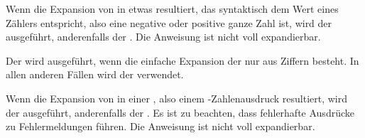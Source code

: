 \begin{Declaration}
\end{Declaration}
Wenn
die Expansion von  in etwas resultiert, das syntaktisch dem Wert
eines Zählers entspricht, also eine negative oder positive ganze Zahl ist,
wird der  ausgeführt, anderenfalls der
. Die Anweisung ist nicht voll expandierbar.%
\iffalse%
\iftrue%
\ Von dieser Anweisung gibt es keine interne Variante.%
\else%
\ Es gibt keine interne Variante.%
\fi%
\fi%
\EndIndexGroup


\begin{Declaration}
\end{Declaration}
Der  wird ausgeführt,
wenn die einfache Expansion der  nur aus Ziffern
besteht. In allen anderen Fällen wird der  verwendet.%
\iffalse%
\iftrue%
\ Von dieser Anweisung gibt es keine interne Variante.%
\else%
\ Es gibt keine interne Variante.%
\fi%
\fi%
\EndIndexGroup


\begin{Declaration}
\end{Declaration}
Wenn
die Expansion von  in einer ,
also einem \eTeX-Zahlenausdruck resultiert, wird der 
ausgeführt, anderenfalls der . Es ist zu
beachten, dass fehlerhafte Ausdrücke zu Fehlermeldungen
führen. Die Anweisung ist nicht voll expandierbar.%
\iffalse%
\iftrue%
\ Von dieser Anweisung gibt es keine interne Variante.%
\else%
\ Es gibt keine interne Variante.%
\fi%
\fi%
\EndIndexGroup


